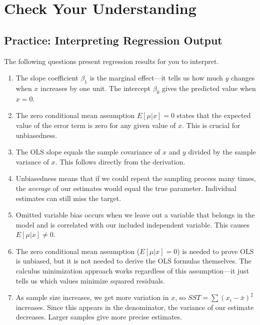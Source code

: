 \documentclass[
  letterpaper,
  DIV=11,
  numbers=noendperiod]{scrreprt}
\begin{document}
\section{Check Your Understanding}\label{check-your-understanding-3}

\subsection{Practice: Interpreting Regression
Output}\label{practice-interpreting-regression-output}

The following questions present regression results for you to interpret.

\begin{tcolorbox}[enhanced jigsaw, arc=.35mm, bottomrule=.15mm, bottomtitle=1mm, breakable, colback=white, colbacktitle=quarto-callout-tip-color!10!white, colframe=quarto-callout-tip-color-frame, coltitle=black, left=2mm, leftrule=.75mm, opacityback=0, opacitybacktitle=0.6, rightrule=.15mm, title=\textcolor{quarto-callout-tip-color}{\faLightbulb}\hspace{0.5em}{Show Explanation}, titlerule=0mm, toprule=.15mm, toptitle=1mm]

\begin{enumerate}
\def\labelenumi{\roman{enumi}.}
\item
  The slope coefficient \(\beta_1\) is the marginal effect---it tells us
  how much \(y\) changes when \(x\) increases by one unit. The intercept
  \(\beta_0\) gives the predicted value when \(x = 0\).
\item
  The zero conditional mean assumption \(E[\mu|x] = 0\) states that the
  expected value of the error term is zero for any given value of \(x\).
  This is crucial for unbiasedness.
\item
  The OLS slope equals the sample covariance of \(x\) and \(y\) divided
  by the sample variance of \(x\). This follows directly from the
  derivation.
\item
  Unbiasedness means that if we could repeat the sampling process many
  times, the \emph{average} of our estimates would equal the true
  parameter. Individual estimates can still miss the target.
\item
  Omitted variable bias occurs when we leave out a variable that belongs
  in the model and is correlated with our included independent variable.
  This causes \(E[\mu|x] \neq 0\).
\item
  The zero conditional mean assumption (\(E[\mu|x] = 0\)) is needed to
  prove OLS is unbiased, but it is not needed to derive the OLS formulas
  themselves. The calculus minimization approach works regardless of
  this assumption---it just tells us which values minimize squared
  residuals.
\item
  As sample size increases, we get more variation in \(x\), so
  \(SST = \sum(x_i - \bar{x})^2\) increases. Since this appears in the
  denominator, the variance of our estimate decreases. Larger samples
  give more precise estimates.
\end{enumerate}


\end{tcolorbox}
\end{document}
